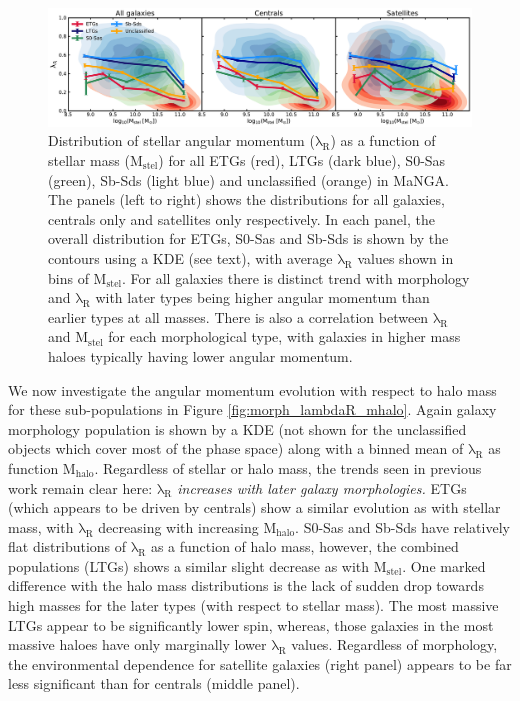 \begin{figure}
    \centering\includegraphics[width=\linewidth]{thesis/latex/cw_spin/morphology_lambdaR_mstel_kde_wo_unclassified.pdf}
    \caption{Distribution of stellar angular momentum ($\mathrm{\lambda_R}$) as a function of stellar mass ($\mathrm{M_{stel}}$) for all ETGs (red), LTGs (dark blue), S0-Sas (green), Sb-Sds (light blue) and unclassified (orange) in MaNGA. The panels (left to right) shows the distributions for all galaxies, centrals only and satellites only respectively. In each panel, the overall distribution for ETGs, S0-Sas and Sb-Sds is shown by the contours using a KDE (see text), with average $\mathrm{\lambda_R}$ values shown in bins of $\mathrm{M_{stel}}$. For all galaxies there is distinct trend with morphology and $\mathrm{\lambda_R}$  with later types being higher angular momentum than earlier types at all masses. There is also a correlation between $\mathrm{\lambda_R}$  and $\mathrm{M_{stel}}$ for each morphological type, with galaxies in higher mass haloes typically having lower angular momentum.}
\label{fig:morph_lambdaR_mstel}
\end{figure}

We now investigate the angular momentum evolution with respect to halo mass for these sub-populations in Figure \ref{fig:morph_lambdaR_mhalo}. Again galaxy morphology population is shown by a KDE (not shown for the unclassified objects which cover most of the phase space) along with a binned mean of $\mathrm{\lambda_R}$ as function $\mathrm{M_{halo}}$. Regardless of stellar or halo mass, the trends seen in previous work remain clear here: \textit{$\mathrm{\lambda_R}$ increases with later galaxy morphologies.} ETGs (which appears to be driven by centrals) show a similar evolution as with stellar mass, with $\mathrm{\lambda_R}$ decreasing with increasing $\mathrm{M_{halo}}$. S0-Sas and Sb-Sds have relatively flat distributions of $\mathrm{\lambda_R}$ as a function of halo mass, however, the combined populations (LTGs) shows a similar slight decrease as with $\mathrm{M_{stel}}$. One marked difference with the halo mass distributions is the lack of sudden drop towards high masses for the later types (with respect to stellar mass). The most massive LTGs appear to be significantly lower spin, whereas, those galaxies in the most massive haloes have only marginally lower $\mathrm{\lambda_R}$ values. Regardless of morphology, the environmental dependence for satellite galaxies (right panel) appears to be far less significant than for centrals (middle panel). 

